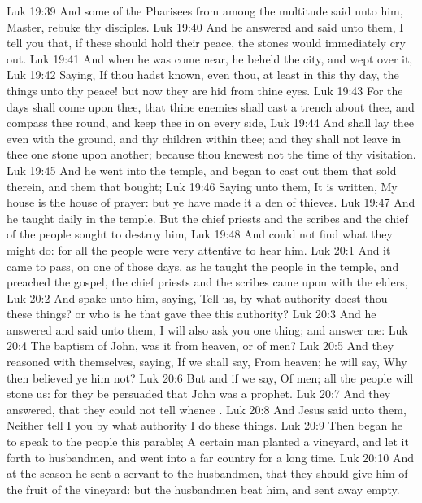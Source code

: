 \vs Luk 19:39 And some of the Pharisees from among the multitude said unto him, Master, rebuke thy disciples.
\vs Luk 19:40 And he answered and said unto them, I tell you that, if these should hold their peace, the stones would immediately cry out.
\vs Luk 19:41 And when he was come near, he beheld the city, and wept over it,
\vs Luk 19:42 Saying, If thou hadst known, even thou, at least in this thy day, the things  unto thy peace! but now they are hid from thine eyes.
\vs Luk 19:43 For the days shall come upon thee, that thine enemies shall cast a trench about thee, and compass thee round, and keep thee in on every side,
\vs Luk 19:44 And shall lay thee even with the ground, and thy children within thee; and they shall not leave in thee one stone upon another; because thou knewest not the time of thy visitation.
\vs Luk 19:45 And he went into the temple, and began to cast out them that sold therein, and them that bought;
\vs Luk 19:46 Saying unto them, It is written, My house is the house of prayer: but ye have made it a den of thieves.
\vs Luk 19:47 And he taught daily in the temple. But the chief priests and the scribes and the chief of the people sought to destroy him,
\vs Luk 19:48 And could not find what they might do: for all the people were very attentive to hear him.
\vs Luk 20:1 And it came to pass,  on one of those days, as he taught the people in the temple, and preached the gospel, the chief priests and the scribes came upon  with the elders,
\vs Luk 20:2 And spake unto him, saying, Tell us, by what authority doest thou these things? or who is he that gave thee this authority?
\vs Luk 20:3 And he answered and said unto them, I will also ask you one thing; and answer me:
\vs Luk 20:4 The baptism of John, was it from heaven, or of men?
\vs Luk 20:5 And they reasoned with themselves, saying, If we shall say, From heaven; he will say, Why then believed ye him not?
\vs Luk 20:6 But and if we say, Of men; all the people will stone us: for they be persuaded that John was a prophet.
\vs Luk 20:7 And they answered, that they could not tell whence .
\vs Luk 20:8 And Jesus said unto them, Neither tell I you by what authority I do these things.
\vs Luk 20:9 Then began he to speak to the people this parable; A certain man planted a vineyard, and let it forth to husbandmen, and went into a far country for a long time.
\vs Luk 20:10 And at the season he sent a servant to the husbandmen, that they should give him of the fruit of the vineyard: but the husbandmen beat him, and sent  away empty.
